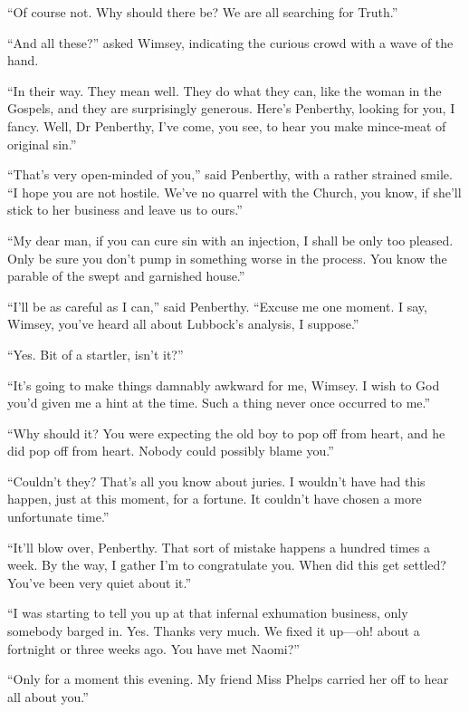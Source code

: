 \enquote{Of course not. Why should there be? We are all searching for Truth.}

\enquote{And all these?} asked Wimsey, indicating the curious crowd with a wave of the hand.

\enquote{In their way. They mean well. They do what they can, like the woman in the Gospels, and they are surprisingly generous. Here's Penberthy, looking for you, I fancy. Well, Dr Penberthy, I've come, you see, to hear you make mince-meat of original sin.}

\enquote{That's very open-minded of you,} said Penberthy, with a rather strained smile. \enquote{I hope you are not hostile. We've no quarrel with the Church, you know, if she'll stick to her business and leave us to ours.}

\enquote{My dear man, if you can cure sin with an injection, I shall be only too pleased. Only be sure you don't pump in something worse in the process. You know the parable of the swept and garnished house.}

\enquote{I'll be as careful as I can,} said Penberthy. \enquote{Excuse me one moment. I say, Wimsey, you've heard all about Lubbock's analysis, I suppose.}

\enquote{Yes. Bit of a startler, isn't it?}

\enquote{It's going to make things damnably awkward for me, Wimsey. I wish to God you'd given me a hint at the time. Such a thing never once occurred to me.}

\enquote{Why should it? You were expecting the old boy to pop off from heart, and he did pop off from heart. Nobody could possibly blame you.}

\enquote{Couldn't they? That's all you know about juries. I wouldn't have had this happen, just at this moment, for a fortune. It couldn't have chosen a more unfortunate time.}

\enquote{It'll blow over, Penberthy. That sort of mistake happens a hundred times a week. By the way, I gather I'm to congratulate you. When did this get settled? You've been very quiet about it.}

\enquote{I was starting to tell you up at that infernal exhumation business, only somebody barged in. Yes. Thanks very much. We fixed it up\allowbreak---\allowbreak oh! about a fortnight or three weeks ago. You have met Naomi?}

\enquote{Only for a moment this evening. My friend Miss Phelps carried her off to hear all about you.}

